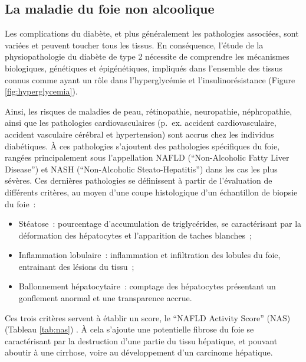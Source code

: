 \documentclass[11pt,a4paper,notrimn]{krantz}
\theoremstyle{definition}
\theoremstyle{definition}
\theoremstyle{remark}
\begin{document}
\subsection{La maladie du foie non
alcoolique}\label{la-maladie-du-foie-non-alcoolique}

Les complications du diabète, et plus généralement les pathologies
associées, sont variées et peuvent toucher tous les tissus. En
conséquence, l'étude de la physiopathologie du diabète de type 2
nécessite de comprendre les mécanismes biologiques, génétiques et
épigénétiques, impliqués dans l'ensemble des tissus connus comme ayant
un rôle dans l'hyperglycémie et l'insulinorésistance (Figure
\ref{fig:hyperglycemia}).

Ainsi, les risques de maladies de peau, rétinopathie, neuropathie,
néphropathie, ainsi que les pathologies cardiovasculaires (p.~ex.
accident cardiovasculaire, accident vasculaire cérébral et hypertension)
sont accrus chez les individus diabétiques. À ces pathologies s'ajoutent
des pathologies spécifiques du foie, rangées principalement sous
l'appellation NAFLD (``Non-Alcoholic Fatty Liver Disease'') et NASH
(``Non-Alcoholic Steato-Hepatitis'') dans les cas les plus sévères. Ces
dernières pathologies se définissent à partir de l'évaluation de
différents critères, au moyen d'une coupe histologique d'un échantillon
de biopsie du foie~:

\begin{itemize}
\item
  Stéatose~: pourcentage d'accumulation de triglycérides, se
  caractérisant par la déformation des hépatocytes et l'apparition de
  taches blanches~;
\item
  Inflammation lobulaire~: inflammation et infiltration des lobules du
  foie, entrainant des lésions du tissu~;
\item
  Ballonnement hépatocytaire~: comptage des hépatocytes présentant un
  gonflement anormal et une transparence accrue.
\end{itemize}

Ces trois critères servent à établir un score, le ``NAFLD Activity
Score'' (NAS) (Tableau \ref{tab:nas}) \citep{kleiner_design_2005}. À
cela s'ajoute une potentielle fibrose du foie se caractérisant par la
destruction d'une partie du tissu hépatique, et pouvant aboutir à une
cirrhose, voire au développement d'un carcinome hépatique.
\end{document}
